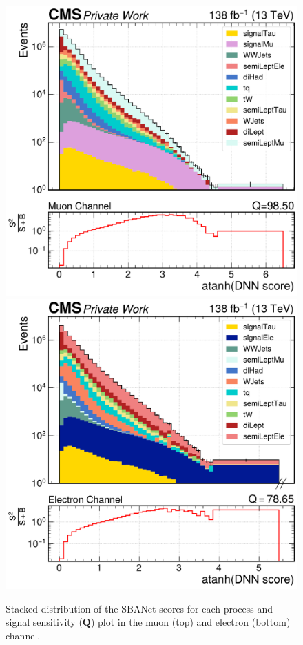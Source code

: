 \begin{figure}[H]
    \centering
    \includegraphics[height=0.48\textheight]{fig//chap09-sigback/stack_score_muons.pdf}
    \includegraphics[height=0.48\textheight]{fig//chap09-sigback/stack_score_electrons.pdf}
    \caption{Stacked distribution of the SBANet scores for each process and signal sensitivity ($\bm{Q}$) plot in the muon (top) and electron (bottom) channel.}
    \label{fig:SBANET_scores}
\end{figure}

